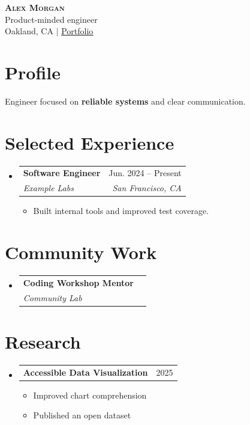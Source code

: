 \documentclass[letterpaper,11pt]{article}
\makeatletter
\newcommand{\resumeLink}[2]{\underline{\href{#1}{#2}}}
\newcommand{\resumeSection}[1]{\section{#1}}
\newcommand{\resumeSubHeadingListStart}{\begin{itemize}[leftmargin=0.15in, label={}]}
\newcommand{\resumeSubHeadingListEnd}{\end{itemize}}
\newcommand{\resumeItemListStart}{\begin{itemize}}
\newcommand{\resumeItemListEnd}{\end{itemize}\vspace{-5pt}}
\newcommand{\resumeItem}[1]{\item\small{{#1 \vspace{-2pt}}}}
\newcommand{\resumeSubheading}[4]{\vspace{-2pt}\item\begin{tabular*}{0.97\textwidth}[t]{l@{\extracolsep{\fill}}r}\textbf{#1} & #2 \\\textit{\small#3} & \textit{\small #4} \\\end{tabular*}\vspace{-7pt}}
\newcommand{\resumeProjectHeading}[2]{\item\begin{tabular*}{0.97\textwidth}{l@{\extracolsep{\fill}}r}\small#1 & #2 \\\end{tabular*}\vspace{-7pt}}
\newcommand{\resumeSingleLine}[2]{\resumeProjectHeading{\textbf{#1}}{#2}}
\newcommand{\resumeTextBlock}[1]{\small{#1\par}\vspace{-2pt}}
\makeatother
\begin{document}
\begin{center}
    \textbf{\Huge \scshape Alex Morgan} \\ \vspace{5pt}
    \small Product-minded engineer \\
    \small Oakland, CA $|$ \resumeLink{https://example.com}{Portfolio} \\
\end{center}
\resumeSection{Profile}
\resumeTextBlock{Engineer focused on \textbf{reliable systems} and clear communication.}
\resumeSection{Selected Experience}
\resumeSubHeadingListStart
\resumeSubheading{Software Engineer}{Jun. 2024 -- Present}{Example Labs}{San Francisco, CA}
\resumeItemListStart
\resumeItem{Built internal tools and improved test coverage.}
\resumeItemListEnd
\resumeSubHeadingListEnd
\resumeSection{Community Work}
\resumeSubHeadingListStart
\resumeSubheading{Coding Workshop Mentor}{}{Community Lab}{}
\resumeSubHeadingListEnd
\resumeSection{Research}
\resumeSubHeadingListStart
\resumeSingleLine{Accessible Data Visualization}{2025}
\resumeItemListStart
\resumeItem{Improved chart comprehension}
\resumeItem{Published an open dataset}
\resumeItemListEnd
\resumeSubHeadingListEnd
\end{document}
